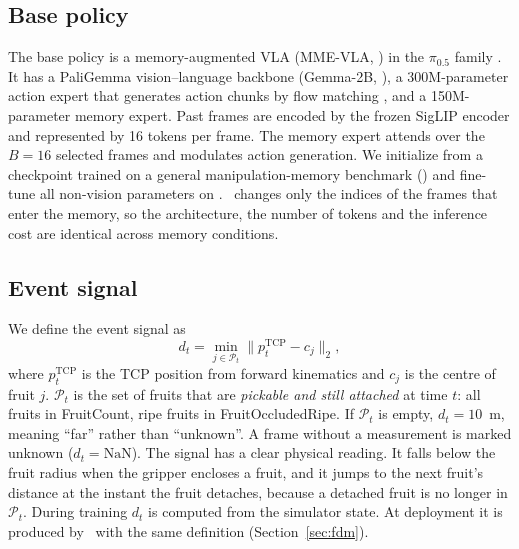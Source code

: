 \subsection{Base policy}
The base policy is a memory-augmented VLA (MME-VLA, ) in the $\pi_{0.5}$ family \citep{pi05_2025}. It has a PaliGemma vision--language backbone (Gemma-2B, \citealp{beyer2024paligemma}), a 300M-parameter action expert that generates action chunks by flow matching \citep{lipman2023flow}, and a 150M-parameter memory expert. Past frames are encoded by the frozen SigLIP encoder \citep{zhai2023siglip} and represented by 16 tokens per frame. The memory expert attends over the $B=16$ selected frames and modulates action generation. We initialize from a checkpoint trained on a general manipulation-memory benchmark () and fine-tune all non-vision parameters on \bench. \pekm\ changes only the indices of the frames that enter the memory, so the architecture, the number of tokens and the inference cost are identical across memory conditions.

\subsection{Event signal}
\label{sec:signal}
We define the event signal as
\begin{equation}
d_t = \min_{j \in \mathcal{P}_t} \lVert p^{\mathrm{TCP}}_t - c_j \rVert_2,
\label{eq:signal}
\end{equation}
where $p^{\mathrm{TCP}}_t$ is the TCP position from forward kinematics and $c_j$ is the centre of fruit $j$. $\mathcal{P}_t$ is the set of fruits that are \emph{pickable and still attached} at time $t$: all fruits in FruitCount, ripe fruits in FruitOccludedRipe. If $\mathcal{P}_t$ is empty, $d_t = 10$~m, meaning ``far'' rather than ``unknown''. A frame without a measurement is marked unknown ($d_t = \mathrm{NaN}$). The signal has a clear physical reading. It falls below the fruit radius when the gripper encloses a fruit, and it jumps to the next fruit's distance at the instant the fruit detaches, because a detached fruit is no longer in $\mathcal{P}_t$. During training $d_t$ is computed from the simulator state. At deployment it is produced by \fdm\ with the same definition (Section~\ref{sec:fdm}).


